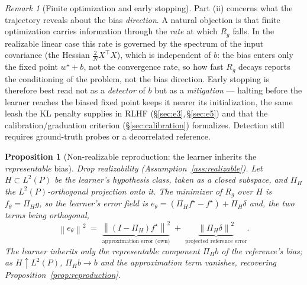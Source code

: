 \documentclass[10pt]{article} %
\theoremstyle{plain}
\newtheorem{proposition}{Proposition}
\theoremstyle{remark}
\newtheorem{remark}{Remark}
\newcommand{\fstar}{f^{\star}}
\newcommand{\norm}[1]{\left\lVert #1 \right\rVert}
\begin{document}
\begin{remark}[Finite optimization and early stopping]
Part (ii) concerns what the trajectory reveals about the bias \emph{direction}. A natural objection is that finite optimization carries information through the \emph{rate} at which $R_g$ falls. In the realizable linear case this rate is governed by the spectrum of the input covariance (the Hessian $\tfrac{2}{N}X^\top X$), which is independent of $b$: the bias enters only the fixed point $w^\star+b$, not the convergence rate, so how fast $R_g$ decays reports the conditioning of the problem, not the bias direction. Early stopping is therefore best read not as a \emph{detector} of $b$ but as a \emph{mitigation} --- halting before the learner reaches the biased fixed point keeps it nearer its initialization, the same leash the KL penalty supplies in RLHF (\S\ref{sec:e3},\,\S\ref{sec:e5}) and that the calibration/graduation criterion (\S\ref{sec:calibration}) formalizes. Detection still requires ground-truth probes or a decorrelated reference.
\end{remark}

\begin{proposition}[Non-realizable reproduction: the learner inherits the \emph{representable} bias]
\label{prop:nonrealizable}
Drop realizability (Assumption~\ref{ass:realizable}). Let $H\subset L^2(P)$ be the learner's hypothesis class, taken as a closed subspace, and $\Pi_H$ the $L^2(P)$-orthogonal projection onto it. The minimizer of $R_g$ over $H$ is $f_\theta=\Pi_H g$, so the learner's error field is $e_\theta=(\Pi_H\fstar-\fstar)+\Pi_H\delta$ and, the two terms being orthogonal,
\[
\norm{e_\theta}^2 \;=\; \underbrace{\norm{(I-\Pi_H)\fstar}^2}_{\text{approximation error (own)}} \;+\; \underbrace{\norm{\Pi_H\delta}^2}_{\text{projected reference error}}.
\]
The learner inherits only the representable component $\Pi_H b$ of the reference's bias; as $H\uparrow L^2(P)$, $\Pi_H b\to b$ and the approximation term vanishes, recovering Proposition~\ref{prop:reproduction}.
\end{proposition}
\end{document}
